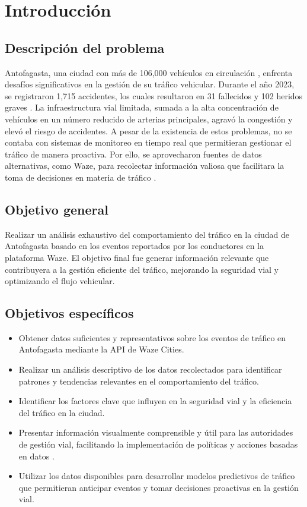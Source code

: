 \documentclass[12pt]{article}
\begin{document}
\section{Introducción}
\subsection{Descripción del problema}

Antofagasta, una ciudad con más de 106,000 vehículos en circulación \parencite{comision2023}, enfrenta desafíos significativos en la gestión de su tráfico vehicular. Durante el año 2023, se registraron 1,715 accidentes, los cuales resultaron en 31 fallecidos y 102 heridos graves \parencite{comision2023}. La infraestructura vial limitada, sumada a la alta concentración de vehículos en un número reducido de arterias principales, agravó la congestión y elevó el riesgo de accidentes. A pesar de la existencia de estos problemas, no se contaba con sistemas de monitoreo en tiempo real que permitieran gestionar el tráfico de manera proactiva. Por ello, se aprovecharon fuentes de datos alternativas, como Waze, para recolectar información valiosa que facilitara la toma de decisiones en materia de tráfico \parencite{chen2015}.

\subsection{Objetivo general}

Realizar un análisis exhaustivo del comportamiento del tráfico en la ciudad de Antofagasta basado en los eventos reportados por los conductores en la plataforma Waze. El objetivo final fue generar información relevante que contribuyera a la gestión eficiente del tráfico, mejorando la seguridad vial y optimizando el flujo vehicular.

\subsection{Objetivos específicos}

\begin{itemize}
    \item Obtener datos suficientes y representativos sobre los eventos de tráfico en Antofagasta mediante la API de Waze Cities.
    \item Realizar un análisis descriptivo de los datos recolectados para identificar patrones y tendencias relevantes en el comportamiento del tráfico.
    \item Identificar los factores clave que influyen en la seguridad vial y la eficiencia del tráfico en la ciudad.
    \item Presentar información visualmente comprensible y útil para las autoridades de gestión vial, facilitando la implementación de políticas y acciones basadas en datos \parencite{auld2009}.
    \item Utilizar los datos disponibles para desarrollar modelos predictivos de tráfico que permitieran anticipar eventos y tomar decisiones proactivas en la gestión vial.
\end{itemize}
\end{document}

